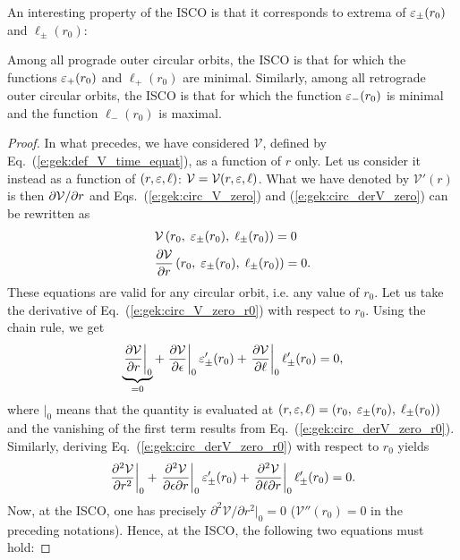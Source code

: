 An interesting property of the ISCO is that it corresponds to extrema of
$\varepsilon_\pm(r_0)$ and $\ell_\pm(r_0)$:
\begin{greybox}
Among all prograde outer circular orbits, the ISCO is that for which
the functions $\varepsilon_+(r_0)$ and $\ell_+(r_0)$ are minimal.
Similarly, among all retrograde outer circular orbits, the ISCO is that for
which the function $\varepsilon_-(r_0)$ is minimal and the function $\ell_-(r_0)$
is maximal.
\end{greybox}
\begin{proof}
In what precedes, we have considered $\mathcal{V}$, defined by
Eq.~(\ref{e:gek:def_V_time_equat}), as a function of $r$ only. Let us consider
it instead as a function of $(r, \varepsilon, \ell)$: $\mathcal{V} = \mathcal{V}(r, \varepsilon, \ell)$.
What we have denoted by
$\mathcal{V}'(r)$ is then ${\partial \mathcal{V}}/{\partial r}$ and
Eqs.~(\ref{e:gek:circ_V_zero}) and (\ref{e:gek:circ_derV_zero}) can be rewritten
as
\begin{subequations}
\begin{align}
& \mathcal{V}\left(r_0,\; \varepsilon_\pm(r_0),\; \ell_\pm(r_0)\right) = 0 \label{e:gek:circ_V_zero_r0} \\
& \frac{\partial \mathcal{V}}{\partial r} \left(r_0,\; \varepsilon_\pm(r_0),\; \ell_\pm(r_0)\right) = 0 .
    \label{e:gek:circ_derV_zero_r0}
\end{align}
\end{subequations}
These equations are valid for any circular orbit, i.e. any value of $r_0$.
Let us take the derivative of Eq.~(\ref{e:gek:circ_V_zero_r0}) with respect to $r_0$.
Using the chain rule, we get
\[
    \underbrace{\left. \frac{\partial \mathcal{V}}{\partial r} \right| _0}_{=0}
    + \left. \frac{\partial \mathcal{V}}{\partial \epsilon} \right| _0  \varepsilon_\pm'(r_0)
    + \left. \frac{\partial \mathcal{V}}{\partial \ell} \right| _0  \ell_\pm'(r_0) = 0 ,
\]
where $| _0$ means that the quantity is evaluated at $(r,\varepsilon,\ell)=\left(r_0,\; \varepsilon_\pm(r_0),\; \ell_\pm(r_0)\right)$ and the vanishing of the first term results from Eq.~(\ref{e:gek:circ_derV_zero_r0}).
Similarly, deriving Eq.~(\ref{e:gek:circ_derV_zero_r0}) with respect to $r_0$ yields
\[
    \left. \frac{\partial^2\mathcal{V}}{\partial r^2} \right| _0
    + \left. \frac{\partial^2\mathcal{V}}{\partial\epsilon\partial r} \right| _0  \varepsilon_\pm'(r_0)
    + \left. \frac{\partial^2\mathcal{V}}{\partial\ell\partial r} \right| _0  \ell_\pm'(r_0)
    = 0 .
\]
Now, at the ISCO, one has precisely ${\partial^2\mathcal{V}}/{\partial r^2} |_0 = 0$
($\mathcal{V}''(r_0) = 0$ in the preceding notations). Hence, at the ISCO, the following
two equations must hold:

\end{proof}
